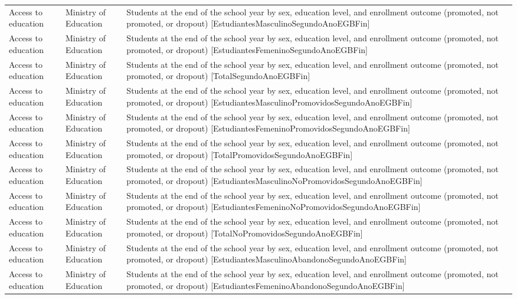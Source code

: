 \documentclass[10pt,a4paper]{article}
\begin{document}
\begin{longtable}{@{}>{\raggedright\arraybackslash}p{3.5cm}>{\raggedright\arraybackslash}p{5.6cm}>{\raggedright\arraybackslash}p{\dimexpr\textwidth-9.1cm-4\tabcolsep\relax}@{}}
Access to education & Ministry of Education & Students at the end of the school year by sex, education level, and enrollment outcome (promoted, not promoted, or dropout) [EstudiantesMasculinoSegundoAnoEGBFin]\\
Access to education & Ministry of Education & Students at the end of the school year by sex, education level, and enrollment outcome (promoted, not promoted, or dropout) [EstudiantesFemeninoSegundoAnoEGBFin]\\
Access to education & Ministry of Education & Students at the end of the school year by sex, education level, and enrollment outcome (promoted, not promoted, or dropout) [TotalSegundoAnoEGBFin]\\
Access to education & Ministry of Education & Students at the end of the school year by sex, education level, and enrollment outcome (promoted, not promoted, or dropout) [EstudiantesMasculinoPromovidosSegundoAnoEGBFin]\\
Access to education & Ministry of Education & Students at the end of the school year by sex, education level, and enrollment outcome (promoted, not promoted, or dropout) [EstudiantesFemeninoPromovidosSegundoAnoEGBFin]\\
Access to education & Ministry of Education & Students at the end of the school year by sex, education level, and enrollment outcome (promoted, not promoted, or dropout) [TotalPromovidosSegundoAnoEGBFin]\\
Access to education & Ministry of Education & Students at the end of the school year by sex, education level, and enrollment outcome (promoted, not promoted, or dropout) [EstudiantesMasculinoNoPromovidosSegundoAnoEGBFin]\\
Access to education & Ministry of Education & Students at the end of the school year by sex, education level, and enrollment outcome (promoted, not promoted, or dropout) [EstudiantesFemeninoNoPromovidosSegundoAnoEGBFin]\\
Access to education & Ministry of Education & Students at the end of the school year by sex, education level, and enrollment outcome (promoted, not promoted, or dropout) [TotalNoPromovidosSegundoAnoEGBFin]\\
Access to education & Ministry of Education & Students at the end of the school year by sex, education level, and enrollment outcome (promoted, not promoted, or dropout) [EstudiantesMasculinoAbandonoSegundoAnoEGBFin]\\
Access to education & Ministry of Education & Students at the end of the school year by sex, education level, and enrollment outcome (promoted, not promoted, or dropout) [EstudiantesFemeninoAbandonoSegundoAnoEGBFin]\\

\end{longtable}
\end{document}
